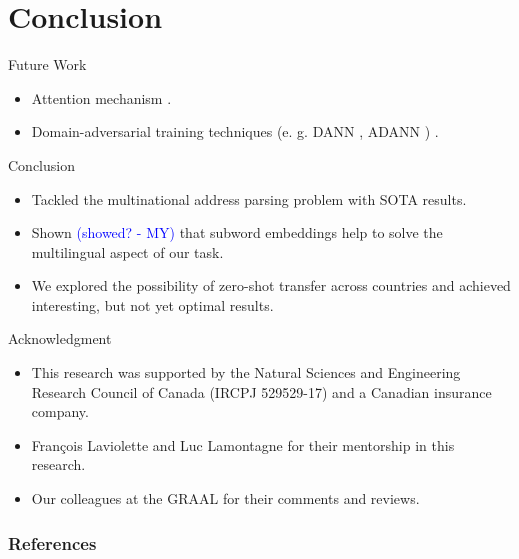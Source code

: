 \documentclass{beamer}
\newcommand{\marouane}[1]{\textcolor{blue}{(#1 - MY)}}
\begin{document}
	\section{Conclusion}
	\begin{frame}{Future Work}
		\begin{itemize}
			\item<1-> Attention mechanism \cite{bahdanau2014neural}.
			\item<2-> Domain-adversarial training techniques (e. g. DANN \cite{ganin2015domainadversarial}, ADANN \cite{ADANN}) .
		\end{itemize}
	\end{frame}
	\begin{frame}{Conclusion}
		\begin{itemize}
			\item<1-> Tackled the multinational address parsing problem with SOTA results.
			\item<2-> Shown \marouane{showed?} that subword embeddings help to solve the multilingual aspect of our task.
			\item<3-> We explored the possibility of zero-shot transfer across countries and achieved interesting, but not yet optimal results.
		\end{itemize}		
	\end{frame}

	\begin{frame}{Acknowledgment}
		\begin{itemize}
			\item This research was supported by the Natural Sciences and Engineering Research Council of Canada (IRCPJ 529529-17) and a Canadian insurance company. 
			\item François Laviolette and Luc Lamontagne for their mentorship in this research.
			\item Our colleagues at the GRAAL for their comments and reviews.
		\end{itemize}
	\end{frame}

	\begin{frame}[t, allowframebreaks]
		\frametitle{References}
		
		
	\end{frame}
		
	
\end{document}
